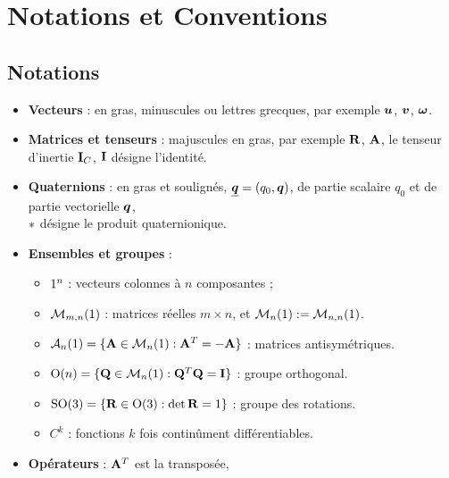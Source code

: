 \documentclass[11pt,a4paper]{report}
\begin{document}
\tableofcontents

\chapter*{Notations et Conventions}

\section*{Notations}

\begin{itemize}
    \item \textbf{Vecteurs} : en gras, minuscules ou lettres grecques,
        par exemple $\bm{u}$, $\bm{v}$, $\bm{\omega}$.
    \item \textbf{Matrices et tenseurs} : majuscules en gras, par
        exemple $\mathbf{R}$, $\mathbf{A}$, le tenseur d'inertie $\mathbf{I}_C$,        $\mathbf{I}$ désigne l'identité.
    \item \textbf{Quaternions} : en gras et soulignés, $\underline{\bm{q}} =
        (q_0,\bm{q})$, de partie scalaire $q_0$ et de partie vectorielle
        $\bm{q}$, \\
        $\ast$ désigne le produit quaternionique.
    \item \textbf{Ensembles et groupes} :
    \begin{itemize}
        \item $1^n$ : vecteurs colonnes à $n$ composantes ;
        \item $\mathcal{M}_{m,n}(1)$ : matrices réelles $m\times n$,
            et $\mathcal{M}_n(1) := \mathcal{M}_{n,n}(1)$.
        \item $\mathcal{A}_n(1) = \{\mathbf{A}\in\mathcal{M}_n(1) :
            \mathbf{A}^T = -\mathbf{A}\}$ : matrices antisymétriques.
        \item $\mathrm{O}(n) = \{\mathbf{Q}\in\mathcal{M}_n(1) :
            \mathbf{Q}^T\mathbf{Q} = \mathbf{I}\}$ : groupe orthogonal.
        \item $\mathrm{SO}(3) = \{\mathbf{R}\in\mathrm{O}(3) : \det\mathbf{R} = 1\}$ :
            groupe des rotations.
        \item $C^k$ : fonctions $k$ fois continûment différentiables.
    \end{itemize}
    \item \textbf{Opérateurs} : $\mathbf{A}^T$ est la transposée,

\end{itemize}
\end{document}
